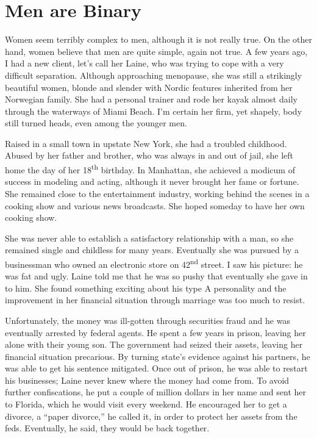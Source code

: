 \section{Men are Binary}

Women seem terribly complex to men, although it is not really true. On the other hand, women believe that men are quite simple, again not true. A few years ago, I had a new client, let's call her Laine, who was trying to cope with a very difficult separation. Although approaching menopause, she was still a strikingly beautiful women, blonde and slender with Nordic features inherited from her Norwegian family. She had a personal trainer and rode her kayak almost daily through the waterways of Miami Beach. I'm certain her firm, yet shapely, body still turned heads, even among the younger men.

Raised in a small town in upstate New York, she had a troubled childhood. Abused by her father and brother, who was always in and out of jail, she left home the day of her 18\textsuperscript{th} birthday. In Manhattan, she achieved a modicum of success in modeling and acting, although it never brought her fame or fortune. She remained close to the entertainment industry, working behind the scenes in a cooking show and various news broadcasts. She hoped someday to have her own cooking show.

She was never able to establish a satisfactory relationship with a man, so she remained single and childless for many years. Eventually she was pursued by a businessman who owned an electronic store on 42\textsuperscript{nd} street. I saw his picture: he was fat and ugly. Laine told me that he was so pushy that eventually she gave in to him. She found something exciting about his type A personality and the improvement in her financial situation through marriage was too much to resist.

Unfortunately, the money was ill-gotten through securities fraud and he was eventually arrested by federal agents. He spent a few years in prison, leaving her alone with their young son. The government had seized their assets, leaving her financial situation precarious. By turning state's evidence against his partners, he was able to get his sentence mitigated. Once out of prison, he was able to restart his businesses; Laine never knew where the money had come from. To avoid further confiscations, he put a couple of million dollars in her name and sent her to Florida, which he would visit every weekend. He encouraged her to get a divorce, a ``paper divorce,'' he called it, in order to protect her assets from the feds. Eventually, he said, they would be back together.

